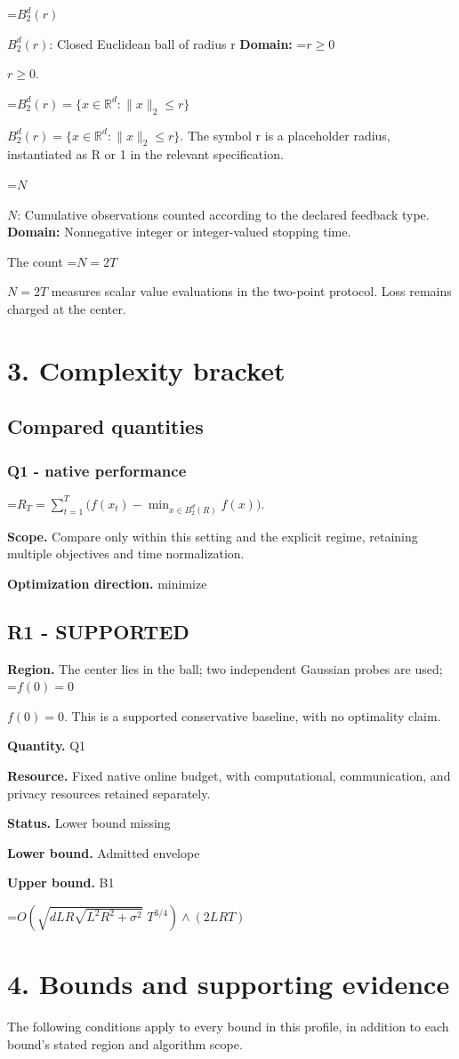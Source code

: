 \documentclass[10pt,a4paper]{article}
\newcommand{\AtlasMath}[1]{\par\begingroup\centering\setbox0=\hbox{$\displaystyle #1$}\ifdim\wd0>1.4\linewidth\typeout{ATLAS WIDE FORMULA: \the\wd0}\fi\ifdim\wd0>\linewidth\resizebox{\linewidth}{!}{\box0}\else\box0\fi\par\endgroup}
\newcommand{\AtlasInlineMath}[1]{\begingroup\setbox0=\hbox{$#1$}\ifdim\wd0>.4\linewidth\endgroup\AtlasMath{#1}\else\endgroup$#1$\fi}
\begin{document}
\AtlasInlineMath{B_2^d(r)}: Closed Euclidean ball of radius r \textbf{Domain:} \AtlasInlineMath{r\ge0}.

\AtlasInlineMath{B_2^d(r)=\{x\in\mathbb R^d:\|x\|_2\le r\}}. The symbol r is a placeholder radius, instantiated as R or 1 in the relevant specification.

\AtlasInlineMath{N}: Cumulative observations counted according to the declared feedback type. \textbf{Domain:} Nonnegative integer or integer-valued stopping time.

The count \AtlasInlineMath{N=2T} measures scalar value evaluations in the two-point protocol. Loss remains charged at the center.

\section{3. Complexity bracket}
\subsection{Compared quantities}
\subsubsection{Q1 - native performance}
\AtlasMath{R_T=\sum_{t=1}^T\bigl(f(x_t)-\min_{x\in B_2^d(R)}f(x)\bigr).}
\textbf{Scope.} Compare only within this setting and the explicit regime, retaining multiple objectives and time normalization.

\textbf{Optimization direction.} minimize

\subsection{R1 - SUPPORTED}
\textbf{Region.} The center lies in the ball; two independent Gaussian probes are used; \AtlasInlineMath{f(0)=0}. This is a supported conservative baseline, with no optimality claim.

\textbf{Quantity.} Q1

\textbf{Resource.} Fixed native online budget, with computational, communication, and privacy resources retained separately.

\textbf{Status.} Lower bound missing

\textbf{Lower bound.} Admitted envelope

\textbf{Upper bound.} B1

\AtlasMath{O(\sqrt{dLR\sqrt{L^2R^2+\sigma^2}}\;T^{3/4})\wedge(2LRT)}
\section{4. Bounds and supporting evidence}
The following conditions apply to every bound in this profile, in addition to each bound's stated region and algorithm scope.
\end{document}
